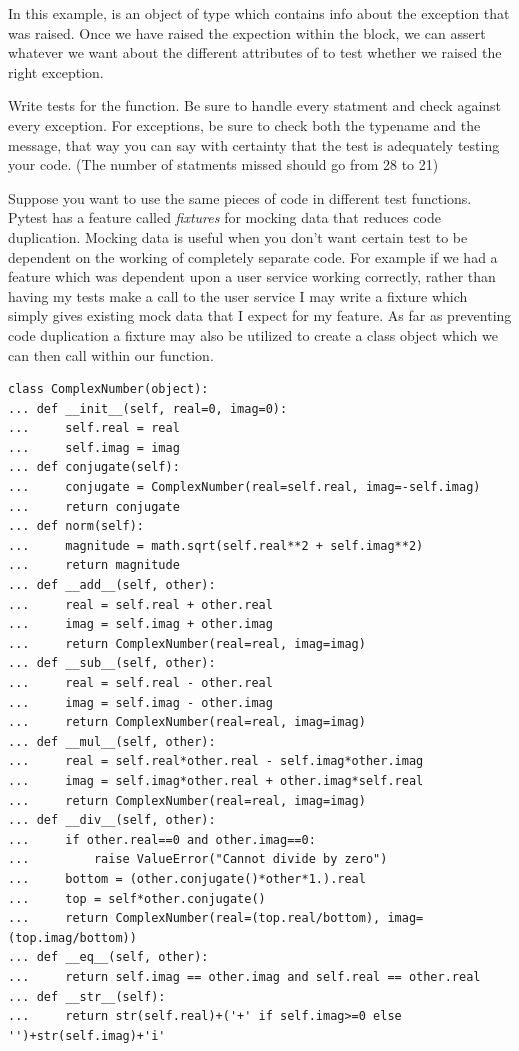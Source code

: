 In this example,  is an object of type  which contains info about the exception that was raised.  Once we have raised the expection within the  block, we can assert whatever we want about the different attributes of  to test whether we raised the right exception.

\begin{problem}
Write tests for the  function.
Be sure to handle every statment and check against every exception.
For exceptions, be sure to check both the typename and the message, that way you can say with certainty that the test is adequately testing your code.
(The number of statments missed should go from 28 to 21)
\end{problem}

Suppose you want to use the same pieces of code in different test functions. Pytest has a feature called \emph{fixtures} for mocking data that reduces code duplication.
Mocking data is useful when you don't want certain test to be dependent on the working of completely separate code.
For example if we had a feature which was dependent upon a user service working correctly, rather than having my tests make a call to the user service I may write a fixture which simply gives existing mock data that I expect for my feature.
As far as preventing code duplication a fixture may also be utilized to create a class object which we can then call within our function.

\begin{lstlisting}
class ComplexNumber(object):
... def __init__(self, real=0, imag=0):
...     self.real = real
...     self.imag = imag
... def conjugate(self):
...     conjugate = ComplexNumber(real=self.real, imag=-self.imag)
...     return conjugate
... def norm(self):
...     magnitude = math.sqrt(self.real**2 + self.imag**2)
...     return magnitude
... def __add__(self, other):
...     real = self.real + other.real
...     imag = self.imag + other.imag
...     return ComplexNumber(real=real, imag=imag)
... def __sub__(self, other):
...     real = self.real - other.real
...     imag = self.imag - other.imag
...     return ComplexNumber(real=real, imag=imag)
... def __mul__(self, other):
...     real = self.real*other.real - self.imag*other.imag
...     imag = self.imag*other.real + other.imag*self.real
...     return ComplexNumber(real=real, imag=imag)
... def __div__(self, other):
...     if other.real==0 and other.imag==0:
...         raise ValueError("Cannot divide by zero")
...     bottom = (other.conjugate()*other*1.).real
...     top = self*other.conjugate()
...     return ComplexNumber(real=(top.real/bottom), imag=(top.imag/bottom))
... def __eq__(self, other):
...     return self.imag == other.imag and self.real == other.real
... def __str__(self):
...     return str(self.real)+('+' if self.imag>=0 else '')+str(self.imag)+'i'
\end{lstlisting}

